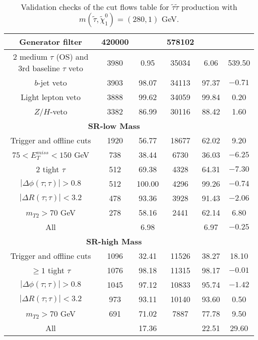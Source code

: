\documentclass[12pt,A4paper,pdftex, ]{article}
\begin{document}
\begin{table}[h!]
\begin{center}
\begin{tabular}{|c|c|c|c|c|c|}
Generator filter & 420000 &  & 578102 &  & \\ \hline
2 medium $\tau$ (OS) and 3rd baseline $\tau$ veto & 3980 & 0.95 & 35034 & 6.06 & 539.50 \\ \hline
$b$-jet veto & 3903 & 98.07 & 34113 & 97.37 & $-0.71$ \\ \hline
Light lepton veto & 3888 & 99.62 & 34059 & 99.84 & 0.20 \\ \hline
$Z/H$-veto & 3382 & 86.99 & 30116 & 88.42 & 1.60 \\ \hline
%
\multicolumn{5}{|c|}{ \textbf{SR-low Mass} }\\\hline
%
Trigger and offline cuts & 1920 & 56.77 & 18677 & 62.02 & 9.20 \\ \hline
$ 75 < E^{miss}_T < 150 $ GeV & 738 & 38.44 & 6730 & 36.03 & $-6.25$ \\ \hline
2 tight $\tau$ & 512 & 69.38 & 4328 & 64.31 & $-7.30$ \\ \hline
$ |\Delta\phi(\tau;\tau)| > 0.8 $ & 512 & 100.00 & 4296 & 99.26 & $-0.74$ \\ \hline
$ |\Delta R(\tau;\tau)| < 3.2 $ & 478 & 93.36 & 3928 & 91.43 & $-2.06$ \\ \hline
$ m_{T2} > 70 $ GeV & 278 & 58.16 & 2441 & 62.14 & 6.80 \\ \hline
All &  & 6.98 &  & 6.97 & $-0.25$ \\ \hline
%
\hline
\multicolumn{5}{|c|}{ \textbf{SR-high Mass} }\\\hline
%
Trigger and offline cuts & 1096 & 32.41 & 11526 & 38.27 & 18.10 \\ \hline
$ \geq 1 $ tight $\tau$ & 1076 & 98.18 & 11315 & 98.17 & $-0.01$ \\ \hline
$ |\Delta\phi(\tau;\tau)| > 0.8 $ & 1045 & 97.12 & 10833 & 95.74 & $-1.42$ \\ \hline
$ |\Delta R(\tau;\tau)| < 3.2 $ & 973 & 93.11 & 10140 & 93.60 & 0.50 \\ \hline
$ m_{T2} > 70 $ GeV & 691 & 71.02 & 7887 & 77.78 & 9.50 \\ \hline
All &  & 17.36 &  & 22.51 & 29.60 \\ \hline

\end{tabular}
\end{center}
\caption{Validation checks of the cut flows table for $ \tilde{\tau}\tilde{\tau} $ production with $ m(\tilde{\tau},\tilde{\chi}^0_1) = (280,1) $ GeV.}
\label{280GeV}
\end{table} 
\end{document}
